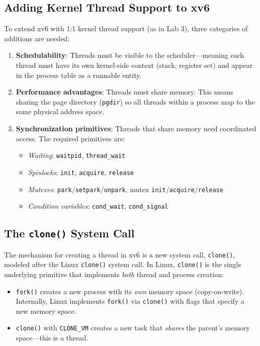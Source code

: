 \documentclass[11pt]{article}
\begin{document}
\subsection{Adding Kernel Thread Support to xv6}

To extend xv6 with 1:1 kernel thread support (as in Lab 3), three categories of additions are needed:

\begin{enumerate}
    \item \textbf{Schedulability}: Threads must be visible to the scheduler---meaning each thread must have its own kernel-side context (stack, register set) and appear in the process table as a runnable entity.
    \item \textbf{Performance advantages}: Threads must share memory. This means sharing the page directory (\texttt{pgdir}) so all threads within a process map to the same physical address space.
    \item \textbf{Synchronization primitives}: Threads that share memory need coordinated access. The required primitives are:
    \begin{itemize}
        \item \emph{Waiting}: \texttt{waitpid}, \texttt{thread\_wait}
        \item \emph{Spinlocks}: \texttt{init}, \texttt{acquire}, \texttt{release}
        \item \emph{Mutexes}: \texttt{park}/\texttt{setpark}/\texttt{unpark}, mutex \texttt{init}/\texttt{acquire}/\texttt{release}
        \item \emph{Condition variables}: \texttt{cond\_wait}, \texttt{cond\_signal}
    \end{itemize}
\end{enumerate}

\subsection{The \texttt{clone()} System Call}

The mechanism for creating a thread in xv6 is a new system call, \texttt{clone()}, modeled after the Linux \texttt{clone()} system call. In Linux, \texttt{clone()} is the single underlying primitive that implements \emph{both} thread and process creation:

\begin{itemize}
    \item \texttt{fork()} creates a new process with its \emph{own} memory space (copy-on-write). Internally, Linux implements \texttt{fork()} via \texttt{clone()} with flags that specify a new memory space.
    \item \texttt{clone()} with \texttt{CLONE\_VM} creates a new task that \emph{shares} the parent's memory space---this is a thread.
\end{itemize}
\end{document}
